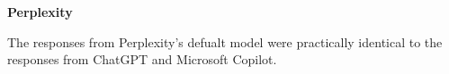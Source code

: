 \textbf{Perplexity}

The responses from Perplexity's defualt model were practically identical to the responses from ChatGPT and Microsoft Copilot.













